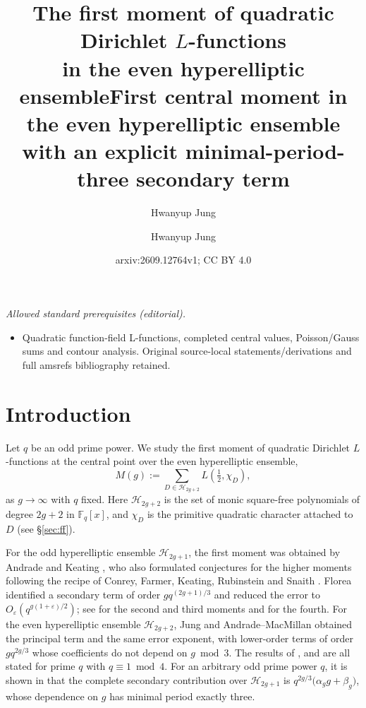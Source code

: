 \documentclass[a4paper,reqno]{amsart}
\title[The first moment over the even hyperelliptic ensemble]
{The first moment of quadratic Dirichlet $L$-functions \\
in the even hyperelliptic ensemble}
\author{Hwanyup Jung}
\title{First central moment in the even hyperelliptic ensemble with an explicit minimal-period-three secondary term}
\author{Hwanyup Jung}
\date{arxiv:2609.12764v1; CC BY 4.0}
\numberwithin{equation}{section}
\theoremstyle{remark}
\theoremstyle{definition}
\begin{document}
\maketitle
\noindent\textit{Allowed standard prerequisites (editorial).}\begin{itemize}
\item Quadratic function-field L-functions, completed central values, Poisson/Gauss sums and contour analysis. Original source-local statements/derivations and full amsrefs bibliography retained.
\end{itemize}\medskip
\setlength{\abovedisplayskip}{4pt plus 2pt minus 1pt}
\setlength{\belowdisplayskip}{4pt plus 2pt minus 1pt}
\setlength{\abovedisplayshortskip}{1pt plus 1pt}
\setlength{\belowdisplayshortskip}{2pt plus 1pt minus 1pt}

\section{Introduction}\label{sec:intro}

Let $q$ be an odd prime power.  We study the first moment of quadratic Dirichlet
$L$-functions at the central point over the even hyperelliptic ensemble,
\begin{equation}\label{eq:moment_intro}
M(g)
:=
\sum_{D\in\mathcal H_{2g+2}}
L\!\left(\tfrac12,\chi_D\right),
\end{equation}
as $g\to\infty$ with $q$ fixed.  Here $\mathcal H_{2g+2}$ is the set of monic square-free
polynomials of degree $2g+2$ in $\mathbb F_q[x]$, and $\chi_D$ is the primitive quadratic
character attached to $D$ (see \S\ref{sec:ff}).

For the odd hyperelliptic ensemble $\mathcal H_{2g+1}$, the first moment was
obtained by Andrade and Keating \cite{AK12}, who also formulated conjectures
for the higher moments \cite{AK14} following the recipe of Conrey, Farmer,
Keating, Rubinstein and Snaith \cite{CFKRS}. Florea \cite{Fl17-1} identified
a secondary term of order $gq^{(2g+1)/3}$ and reduced the error to
$O_\varepsilon(q^{g(1+\varepsilon)/2})$; see \cite{Fl17-2} for the second and
third moments and \cite{Fl17-3} for the fourth. For the even hyperelliptic ensemble $\mathcal H_{2g+2}$,
Jung \cite{Ju20} and Andrade--MacMillan \cite{AM-21} obtained the principal
term and the same error exponent, with lower-order terms of order
$gq^{2g/3}$ whose coefficients do not depend on $g\bmod3$. The results of
\cite{Fl17-1}, \cite{Ju20} and \cite{AM-21} are all stated for prime $q$
with $q\equiv1\bmod4$. For an arbitrary odd prime power $q$, it is shown in
\cite{Ju26} that the complete secondary contribution over
$\mathcal H_{2g+1}$ is $q^{2g/3}\bigl(\alpha_gg+\beta_g\bigr)$, whose
dependence on $g$ has minimal period exactly three.
\end{document}

